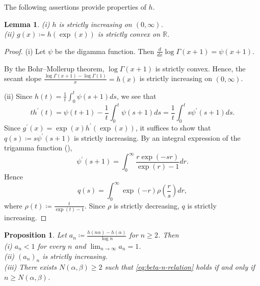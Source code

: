 \documentclass[a4paper, reqno, 11pt]{amsart}
\newtheorem{Lem}[Thm]{Lemma}
\newtheorem{Prop}[Thm]{Proposition}
\theoremstyle{definition}
\begin{document}
The following assertions provide properties of $h$. 

\begin{Lem}\label{lem:property-digamma}
(i) $h$ is strictly increasing on $(0,\infty)$.\\
(ii) $g(x) \coloneqq h(\exp(x))$ is strictly convex on $\mathbb R$. 
\end{Lem}

\begin{proof}
(i) Let $\psi$ be the digamma function. 
Then $\frac{d}{dx} \log \Gamma(x+1) = \psi(x+1)$. 

By the Bohr--Mollerup theorem, 
$\log \Gamma(x+1)$ is strictly convex. 
Hence, the secant slope $\frac{\log\Gamma(x+1)-\log\Gamma(1)}{x} = h(x)$ is strictly increasing on $(0,\infty)$.  

(ii) 
Since $h(t) = \frac{1}{t} \int_0^{t} \psi(s+1) ds$, 
we see that 
\[ t h^{\prime} (t) = \psi(t+1) - \frac{1}{t} \int_0^{t} \psi(s+1) ds = \frac{1}{t} \int_0^t s \psi^{\prime}(s+1) ds.  \]
Since $g^{\prime}(x) = \exp(x) h^{\prime}(\exp(x))$, 
it suffices to show that $q(s) \coloneqq s  \psi^{\prime}(s+1)$ is strictly increasing. 
By an integral expression of the trigamma function (\cite[Formula 6.4.1, p.260]{AS1964}), 
\[ \psi^{\prime}(s+1) = \int_0^{\infty}  \frac{r \exp(-sr)}{\exp(r) -1} dr. \]
Hence
\begin{equation}\label{eq:integral-q} 
q(s) = \int_0^{\infty}  \exp(-r) \rho\left(\frac{r}{s} \right) dr,  
\end{equation}
where $\rho(t) \coloneqq \frac{t}{\exp(t) -1}$. 
Since $\rho$ is strictly decreasing, $q$ is strictly increasing. 
\end{proof}


\begin{Prop}\label{prop:h-increase}
Let $a_n \coloneqq \frac{h(n \alpha) -h(\alpha)}{\log n}$ for $n \ge 2$. 
Then \\
(i) $a_n < 1$ for every $n$ and $\lim_{n \to \infty} a_n = 1$.\\
(ii) $(a_n)_n$ is strictly increasing. \\
(iii) There exists $N(\alpha,\beta) \ge 2$ such that \eqref{eq:beta-n-relation} holds if and only if  $n \ge N(\alpha,\beta)$. 
\end{Prop}
\end{document}
